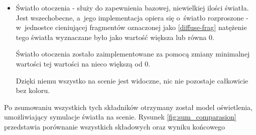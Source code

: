 \documentclass[a4paper,twoside,12pt]{book}
\begin{document}
\begin{itemize}
    \item Światło otoczenia - służy do zapewnienia bazowej, niewielkiej ilości światła. Jest wszechobecne, a~jego implementacja opiera się o~światło rozproszone - w~jednostce cieniującej fragmentów oznaczonej jako \ref{diffuse-frag} natężenie tego światła wyznaczane było jako wartość większa lub równa 0.
    
    \lstset{firstnumber=26}
    
    
    Światło otoczenia zostało zaimplementowane za pomocą zmiany minimalnej wartości tej wartości na nieco większą od 0.
    
    
    \lstset{firstnumber=1}
    
    Dzięki niemu wszystko na scenie jest widoczne, nic nie pozostaje całkowicie bez koloru.
    
\end{itemize}

Po zsumowaniu wszystkich tych składników otrzymany został model oświetlenia, umożliwiający symulacje światła na scenie. Rysunek \ref{fig:sum_comparasion} przedstawia porównanie wszystkich składowych oraz wyniku końcowego
\end{document}
